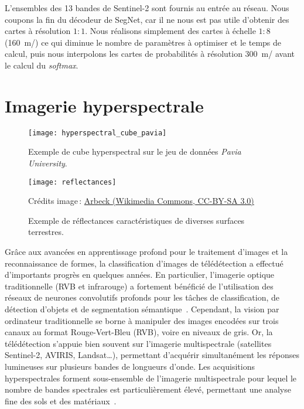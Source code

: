 L'ensembles des 13 bandes de Sentinel-2 sont fournis au entrée au réseau. Nous coupons la fin du décodeur de SegNet, car il ne nous est pas utile d'obtenir des cartes à résolution $1:1$. Nous réalisons simplement des cartes à échelle $1:8$ (\SI{160}{\meter/\px}) ce qui diminue le nombre de paramètres à optimiser et le temps de calcul, puis nous interpolons les cartes de probabilités à résolution \SI{300}{\meter/\px} avant le calcul du \emph{softmax}.




\section{Imagerie hyperspectrale}

\begin{figure}
  \begin{minipage}[t]{0.485\textwidth}
      \texttt{[image: hyperspectral\_cube\_pavia]}
      \caption{Exemple de cube hyperspectral sur le jeu de données \emph{Pavia University}.}
      \label{fig:cube_hyperspectral}
  \end{minipage}
  \hfill
  \begin{minipage}[t]{0.485\textwidth}
      \texttt{[image: reflectances]}
      \caption{Exemple de réflectances caractéristiques de diverses surfaces terrestres.}
      \small{Crédits image\,: \href{https://commons.wikimedia.org/wiki/File:R\%C3\%A9flectance_surfaces_terrestres.png}{Arbeck (Wikimedia Commons, CC-BY-SA 3.0)}}
      \label{fig:reflectances}
  \end{minipage}
\end{figure}

Grâce aux avancées en apprentissage profond pour le traitement d'images et la reconnaissance de formes, la classification d'images de télédétection a effectué d'importants progrès en quelques années. En particulier, l'imagerie optique traditionnelle (\gls{RVB} et infrarouge) a fortement bénéficié de l'utilisation des réseaux de neurones convolutifs profonds pour les tâches de classification, de détection d'objets et de segmentation sémantique~\cite{audebert_semantic_2016,volpi_dense_2017,marmanis_semantic_2016}. Cependant, la vision par ordinateur traditionnelle se borne à manipuler des images encodées sur trois canaux au format Rouge-Vert-Bleu (RVB), voire en niveaux de gris. Or, la télédétection s'appuie bien souvent sur l'imagerie multispectrale (satellites Sentinel-2, AVIRIS, Landsat\dots), permettant d'acquérir simultanément les réponses lumineuses sur plusieurs bandes de longueurs d'onde. Les acquisitions hyperspectrales forment sous-ensemble de l'imagerie multispectrale pour lequel le nombre de bandes spectrales est particulièrement élevé, permettant une analyse fine des sols et des matériaux~\cite{cubero-castan_physics-based_2015,fabre_estimation_2015}.

